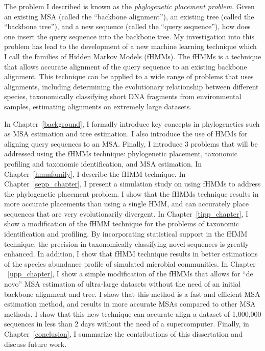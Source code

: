The problem I described is known as the \emph{phylogenetic placement problem}.  Given an existing MSA (called the ``backbone alignment''), an existing tree (called the ``backbone tree''), and a new sequence (called the ``query sequence''), how does one insert the query sequence into the backbone tree.  My investigation into this problem has lead to the development of a new machine learning technique which I call the families of Hidden Markov Models (fHMMs).  The fHMMs is a technique that allows accurate alignment of the query sequence to an existing backbone alignment.  This technique can be applied to a wide range of problems that uses alignments, including determining the evolutionary relationship between different species, taxonomically classifying short DNA fragments from environmental samples, estimating alignments on extremely large datasets.

In Chapter~\ref{background}, I formally introduce key concepts in phylogenetics such as MSA estimation and tree estimation.  I also introduce the use of HMMs for aligning query sequences to an MSA.  Finally, I introduce 3 problems that will be addressed using the fHMMs technique: phylogenetic placement, taxonomic profiling and taxonomic identification, and MSA estimation.  In Chapter~\ref{hmmfamily}, I describe the fHMM technique.  In Chapter~\ref{sepp_chapter}, I present a simulation study on using fHMMs to address the phylogenetic placement problem.  I show that the fHMMs technique results in more accurate placements than using a single HMM, and can accurately place sequences that are very evolutionarily divergent.  In Chapter~\ref{tipp_chapter}, I show a modification of the fHMM technique for the problems of taxonomic identification and profiling.  By incorporating statistical support in the fHMM technique, the precision in taxonomically classifying novel sequences is greatly enhanced.  In addition, I show that fHMM technique results in better estimations of the species abundance profile of simulated microbial communities.  In Chapter ~\ref{upp_chapter}, I show a simple modification of the fHMMs that allows for ``de novo'' MSA estimation of ultra-large datasets without the need of an initial backbone alignment and tree.  I show that this method is a fast and efficient MSA estimation method, and results in more accurate MSAs compared to other MSA methods.  I show that this new technique can accurate align a dataset of 1,000,000 sequences in less than 2 days without the need of a supercomputer.  Finally, in Chapter~\ref{conclusion}, I summarize the contributions of this dissertation and discuss future work.
